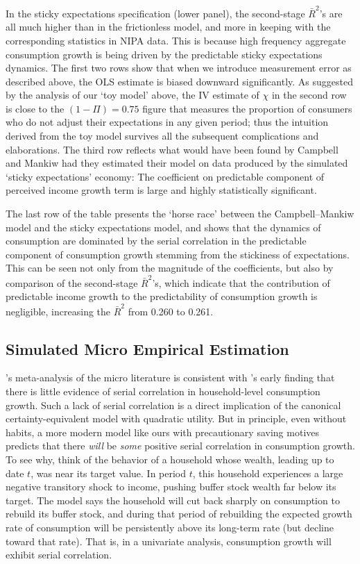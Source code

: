 \documentclass[titlepage]{./econtex}
\begin{document}
In the sticky expectations specification (lower panel), the second-stage $\bar{R}^{2}$'s are all much higher than in the frictionless model, and more in keeping with the corresponding statistics in NIPA data. This is because high frequency aggregate consumption growth is being driven by the predictable sticky expectations dynamics. The first two rows show that when we introduce measurement error as described above, the OLS estimate is biased downward significantly. As suggested by the analysis of our `toy model' above, the IV estimate of $\chi$ in the second row is close to the $(1-\Pi)=0.75$ figure that measures the proportion of consumers who do not adjust their expectations in any given period; thus the intuition derived from the toy model survives all the subsequent complications and elaborations. The third row reflects what would have been found by Campbell and Mankiw had they estimated their model on data produced by the simulated `sticky expectations' economy:  The coefficient on predictable component of perceived income growth term is large and highly statistically significant.

The last row of the table presents the `horse race' between the Campbell--Mankiw model and the sticky expectations model, and shows that the dynamics of consumption are dominated by the serial correlation in the predictable component of consumption growth stemming from the stickiness of expectations.  This can be seen not only from the magnitude of the coefficients, but also by comparison of the second-stage $\bar{R}^{2}$'s, which indicate that the contribution of predictable income growth to the predictability of consumption growth is negligible, increasing the $\bar{R}^2$ from 0.260 to 0.261.


\subsection{Simulated Micro Empirical Estimation} \label{subsec:simMicro}

\cite{hrsHabit}'s meta-analysis of the micro literature is consistent with \cite{dynanHabits}'s early finding that there is little evidence of serial correlation in household-level consumption growth.  Such a lack of serial correlation is a direct implication of the canonical \cite{hallRandomWalk} certainty-equivalent model with quadratic utility.  But in principle, even without habits, a more modern model like ours with precautionary saving motives predicts that there {\it will} be {\it some} positive serial correlation in consumption growth.  To see why, think of the behavior of a household whose wealth, leading up to date $t$, was near its target value.
In period $t$, this household experiences a large negative transitory shock to income, pushing buffer stock wealth far below its target.  The model says the household will cut back sharply on consumption to rebuild its buffer stock, and during that period of rebuilding the expected growth rate of consumption will be persistently above its long-term rate (but decline toward that rate).  That is, in a univariate analysis, consumption growth will exhibit serial correlation.
\end{document}
